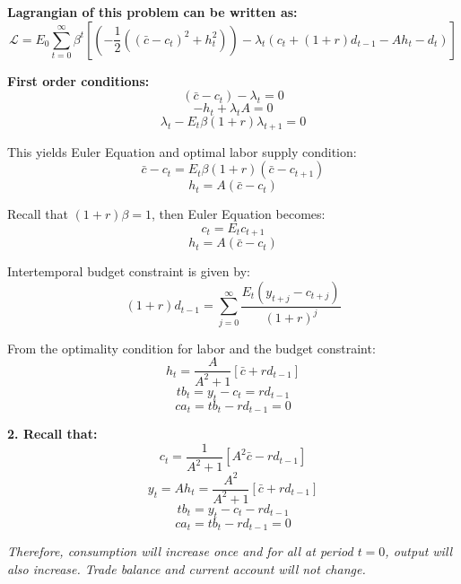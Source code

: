\documentclass{article}
\begin{document}
\textbf{Lagrangian of this problem can be written as:}
\begin{equation}
    \mathcal{L} = E_0 \sum_{t=0}^{\infty} \beta^t \left[ \left(- \frac{1}{2} ((\bar{c} - c_t)^2 + h_t^2) \right) - \lambda_t \left(c_t + (1 + r)d_{t-1} - A h_t - d_t \right) \right]
\end{equation}

\textbf{First order conditions:}
\begin{equation}
    (\bar{c} - c_t) - \lambda_t = 0
\end{equation}
\begin{equation}
    - h_t + \lambda_t A = 0
\end{equation}
\begin{equation}
    \lambda_t - E_t \beta (1 + r) \lambda_{t+1} = 0
\end{equation}

This yields Euler Equation and optimal labor supply condition:
\begin{equation}
    \bar{c} - c_t = E_t \beta(1 + r)(\bar{c} - c_{t+1})
\end{equation}
\begin{equation}
    h_t = A(\bar{c} - c_t)
\end{equation}

Recall that $(1 + r)\beta = 1$, then Euler Equation becomes:
\begin{equation}
    c_t = E_t c_{t+1}
\end{equation}
\begin{equation}
    h_t = A(\bar{c} - c_t)
\end{equation}

Intertemporal budget constraint is given by:
\begin{equation}
    (1 + r)d_{t-1} = \sum_{j=0}^{\infty} \frac{E_t (y_{t+j} - c_{t+j})}{(1 + r)^j}
\end{equation}

From the optimality condition for labor and the budget constraint:
\begin{equation}
    h_t = \frac{A}{A^2 + 1} [\bar{c} + r d_{t-1}]
\end{equation}
\begin{equation}
    tb_t = y_t - c_t = r d_{t-1}
\end{equation}
\begin{equation}
    ca_t = tb_t - r d_{t-1} = 0
\end{equation}

\textbf{2. Recall that:}
\begin{equation}
    c_t = \frac{1}{A^2 + 1} [A^2 \bar{c} - r d_{t-1}]
\end{equation}
\begin{equation}
    y_t = A h_t = \frac{A^2}{A^2 + 1} [\bar{c} + r d_{t-1}]
\end{equation}
\begin{equation}
    tb_t = y_t - c_t - r d_{t-1}
\end{equation}
\begin{equation}
    ca_t = tb_t - r d_{t-1} = 0
\end{equation}

\textit{Therefore, consumption will increase once and for all at period $t=0$, output will also increase. Trade balance and current account will not change.}
\end{document}
